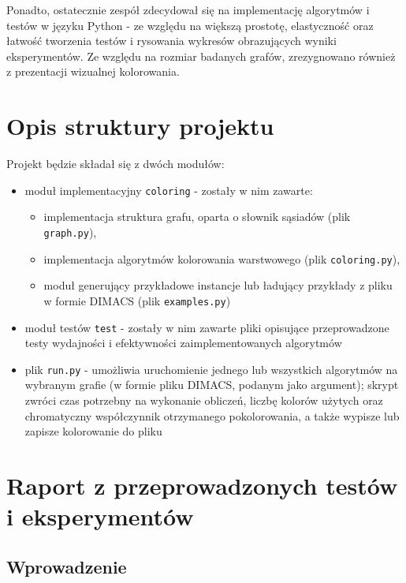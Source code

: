 \documentclass[10pt,a4paper]{article}
\begin{document}
	Ponadto, ostatecznie zespół zdecydował się na implementację algorytmów i testów w języku Python - ze względu na większą prostotę, elastyczność oraz łatwość tworzenia testów i rysowania wykresów obrazujących wyniki eksperymentów. Ze względu na rozmiar badanych grafów, zrezygnowano również z prezentacji wizualnej kolorowania.

	\section{Opis struktury projektu}
	
	Projekt będzie składał się z dwóch modułów:
	\begin{itemize}
		\item moduł implementacyjny \texttt{coloring} - zostały w nim zawarte:
			\begin{itemize}
				\item implementacja struktura grafu, oparta o słownik sąsiadów (plik \texttt{graph.py}),
				\item implementacja algorytmów kolorowania warstwowego (plik \texttt{coloring.py}),
				\item moduł generujący przykładowe instancje lub ładujący przykłady z pliku w formie DIMACS (plik \texttt{examples.py})
			\end{itemize}
		\item moduł testów \texttt{test} - zostały w nim zawarte pliki opisujące przeprowadzone testy wydajności i efektywności zaimplementowanych algorytmów
		\item plik \texttt{run.py} - umożliwia uruchomienie jednego lub wszystkich algorytmów na wybranym grafie (w formie pliku DIMACS, podanym jako argument); skrypt zwróci czas potrzebny na wykonanie obliczeń, liczbę kolorów użytych oraz chromatyczny współczynnik otrzymanego pokolorowania, a także wypisze lub zapisze kolorowanie do pliku 
	\end{itemize}

	\pagebreak
	
	\section{Raport z przeprowadzonych testów i eksperymentów}
	
	\subsection{Wprowadzenie}
	
\end{document}
